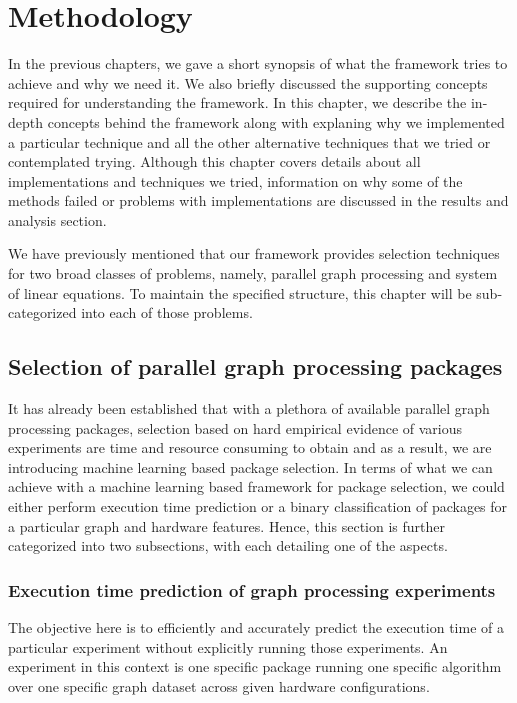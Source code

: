\chapter{Methodology}  \label{ScalabilityModel}

In the previous chapters, we gave a short synopsis of what the framework tries to achieve and why we need it. We also briefly discussed the supporting concepts required for understanding the framework. In this chapter, we describe the in-depth concepts behind the framework along with explaning why we implemented a particular technique and all the other alternative techniques that we tried or contemplated trying. Although this chapter covers details about all implementations and techniques we tried, information on why some of the methods failed or problems with implementations are discussed in the results and analysis section. 

We have previously mentioned that our framework provides selection techniques for two broad classes of problems, namely, parallel graph processing and system of linear equations. To maintain the specified structure, this chapter will be sub-categorized into each of those problems. 

\section{Selection of parallel graph processing packages}
It has already been established that with a plethora of available parallel graph processing packages, selection based on hard empirical evidence of various experiments are time and resource consuming to obtain and as a result, we are introducing machine learning based package selection. In terms of what we can achieve with a machine learning based framework for package selection, we could either perform execution time prediction or a binary classification of packages for a particular graph and hardware features. Hence, this section is further categorized into two subsections, with each detailing one of the aspects. 


\subsection{Execution time prediction of graph processing experiments}
The objective here is to efficiently and accurately predict the execution time of a particular experiment without explicitly running those experiments. An experiment in this context is one specific package running one specific algorithm over one specific graph dataset across given hardware configurations.

